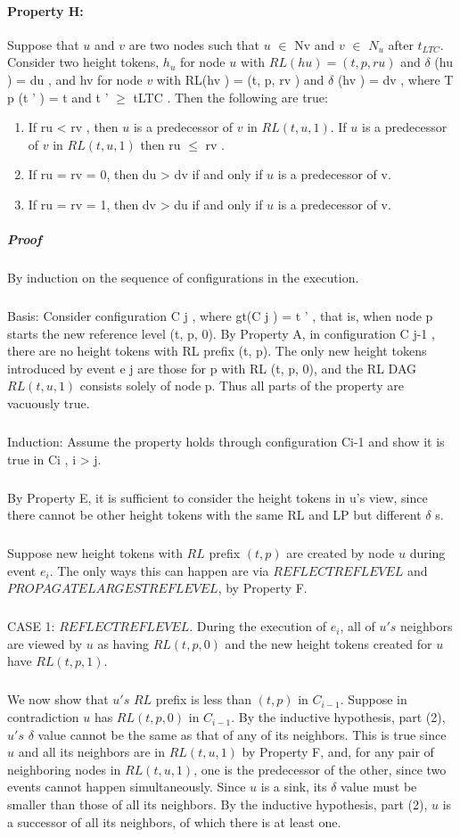 \paragraph{Property H:} Suppose that $u$ and $v$ are two nodes such that $u$ $\in$ Nv and $v$ $\in$ $N_u$ after $t_{LTC}$. Consider two height tokens, $h_u$ for node $u$ with $RL(hu ) = (t, p, ru )$ and $\delta$ (hu ) = du , and hv for node $v$ with RL(hv ) = (t, p, rv ) and $\delta$ (hv ) = dv , where T p (t ' ) = t and t ' $\geq$ tLTC . Then the following are true: 
\begin{enumerate}
	\item If ru < rv , then $u$ is a predecessor of $v$ in $RL (t, u, 1)$. If $u$ is a predecessor of $v$ in $RL (t, u, 1)$ then ru $\leq$ rv .
	\item If ru = rv = 0, then du > dv if and only if $u$ is a predecessor of v.
	\item If ru = rv = 1, then dv > du if and only if $u$ is a predecessor of v.
\end{enumerate}
\subparagraph{Proof} By induction on the sequence of configurations in the execution. 
\subparagraph{}Basis: Consider configuration C j , where gt(C j ) = t ' , that is, when node p starts the new reference level (t, p, 0). By Property A, in configuration C j-1 , there are no height tokens with RL prefix (t, p). The only new height tokens introduced by event e j are those for p with RL (t, p, 0), and the RL DAG $RL (t, u, 1)$ consists solely of node p. Thus all parts of the property are vacuously true.
\subparagraph{}Induction: Assume the property holds through configuration Ci-1 and show it is true in Ci , i > j.
\subparagraph{}By Property E, it is sufficient to consider the height tokens in u's view, since there cannot be other height tokens with the same RL and LP but different $\delta$ s.
\subparagraph{}Suppose new height tokens with $RL$ prefix $(t, p)$ are created by node $u$ during event $e_i$. The only ways this can happen are via $REFLECTREFLEVEL$ and $PROPAGATELARGESTREFLEVEL$, by Property F.
\subparagraph{}CASE 1: $REFLECTREFLEVEL$. During the execution of $e_i$, all of $u's$ neighbors are viewed by $u$ as having $RL (t, p, 0)$ and the new height tokens created for $u$ have $RL (t, p, 1)$.
\subparagraph{}We now show that $u's$ $RL$ prefix is less than $(t, p)$ in $C_{i-1}$. Suppose in contradiction $u$ has $RL (t, p, 0)$ in $C_{i-1}$. By the inductive hypothesis, part (2), $u's$ $\delta$ value cannot be the same as that of any of its neighbors. This is true since $u$ and all its neighbors are in $RL (t, u, 1)$ by Property F, and, for any pair of neighboring nodes in $RL (t, u, 1)$, one is the predecessor of the other, since two events cannot happen simultaneously. Since $u$ is a sink, its $\delta$ value must be smaller than those of all its neighbors. By the inductive hypothesis, part (2), $u$ is a successor of all its neighbors, of which there is at least one.
